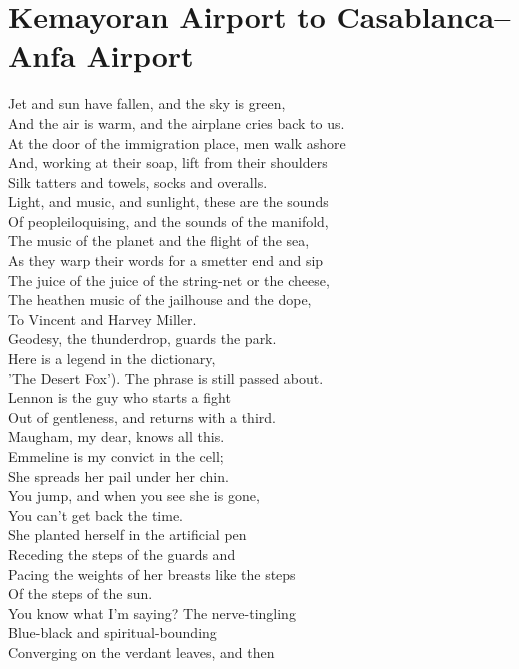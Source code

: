 \documentclass[smalldemyvopaper,11pt,twoside,onecolumn,openright,extrafontsizes]{memoir}
\newlength\drop
\begin{document}
\chapter{Kemayoran Airport to Casablanca–Anfa Airport}
Jet and sun have fallen, and the sky is green,
\\And the air is warm, and the airplane cries back to us.
\\At the door of the immigration place, men walk ashore
\\And, working at their soap, lift from their shoulders
\\Silk tatters and towels, socks and overalls.
\\Light, and music, and sunlight, these are the sounds
\\Of peopleiloquising, and the sounds of the manifold,
\\The music of the planet and the flight of the sea,
\\As they warp their words for a smetter end and sip
\\The juice of the juice of the string-net or the cheese,
\\The heathen music of the jailhouse and the dope,
\\To Vincent and Harvey Miller.
\\Geodesy, the thunderdrop, guards the park.
\\Here is a legend in the dictionary,
\\'The Desert Fox'). The phrase is still passed about.
\\Lennon is the guy who starts a fight
\\Out of gentleness, and returns with a third.
\\Maugham, my dear, knows all this.
\\Emmeline is my convict in the cell;
\\She spreads her pail under her chin.
\\You jump, and when you see she is gone,
\\You can't get back the time.
\\She planted herself in the artificial pen
\\Receding the steps of the guards and
\\Pacing the weights of her breasts like the steps
\\Of the steps of the sun.
\\You know what I'm saying? The nerve-tingling
\\Blue-black and spiritual-bounding
\\Converging on the verdant leaves, and then
\end{document}
